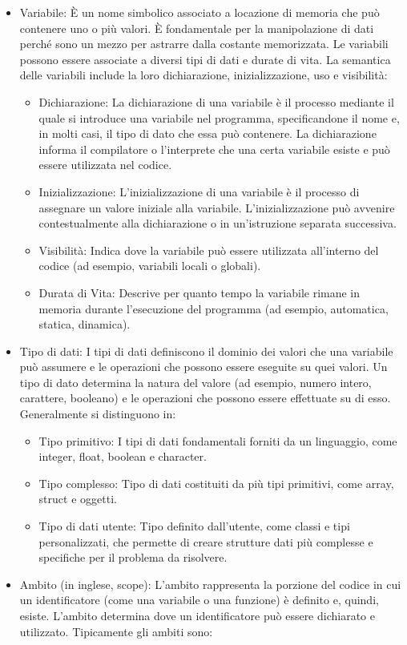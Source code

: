 \documentclass[
  letterpaper,
]{scrbook}
\providecommand{\tightlist}{%
  \setlength{\itemsep}{0pt}\setlength{\parskip}{0pt}}\usepackage{longtable,booktabs,array}
\begin{document}
\begin{itemize}
\tightlist
\item
  Variabile: È un nome simbolico associato a locazione di memoria che
  può contenere uno o più valori. È fondamentale per la manipolazione di
  dati perché sono un mezzo per astrarre dalla costante memorizzata. Le
  variabili possono essere associate a diversi tipi di dati e durate di
  vita. La semantica delle variabili include la loro dichiarazione,
  inizializzazione, uso e visibilità:

  \begin{itemize}
  \tightlist
  \item
    Dichiarazione: La dichiarazione di una variabile è il processo
    mediante il quale si introduce una variabile nel programma,
    specificandone il nome e, in molti casi, il tipo di dato che essa
    può contenere. La dichiarazione informa il compilatore o
    l'interprete che una certa variabile esiste e può essere utilizzata
    nel codice.
  \item
    Inizializzazione: L'inizializzazione di una variabile è il processo
    di assegnare un valore iniziale alla variabile. L'inizializzazione
    può avvenire contestualmente alla dichiarazione o in un'istruzione
    separata successiva.
  \item
    Visibilità: Indica dove la variabile può essere utilizzata
    all'interno del codice (ad esempio, variabili locali o globali).
  \item
    Durata di Vita: Descrive per quanto tempo la variabile rimane in
    memoria durante l'esecuzione del programma (ad esempio, automatica,
    statica, dinamica).
  \end{itemize}
\item
  Tipo di dati: I tipi di dati definiscono il dominio dei valori che una
  variabile può assumere e le operazioni che possono essere eseguite su
  quei valori. Un tipo di dato determina la natura del valore (ad
  esempio, numero intero, carattere, booleano) e le operazioni che
  possono essere effettuate su di esso. Generalmente si distinguono in:

  \begin{itemize}
  \tightlist
  \item
    Tipo primitivo: I tipi di dati fondamentali forniti da un
    linguaggio, come integer, float, boolean e character.
  \item
    Tipo complesso: Tipo di dati costituiti da più tipi primitivi, come
    array, struct e oggetti.
  \item
    Tipo di dati utente: Tipo definito dall'utente, come classi e tipi
    personalizzati, che permette di creare strutture dati più complesse
    e specifiche per il problema da risolvere.
  \end{itemize}
\item
  Ambito (in inglese, scope): L'ambito rappresenta la porzione del
  codice in cui un identificatore (come una variabile o una funzione) è
  definito e, quindi, esiste. L'ambito determina dove un identificatore
  può essere dichiarato e utilizzato. Tipicamente gli ambiti sono:


\end{itemize}
\end{document}
